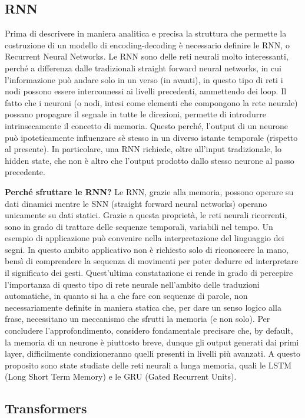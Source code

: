 \subsection{RNN}

Prima di descrivere in maniera analitica e precisa la struttura che permette la costruzione di un modello di encoding-decoding è necessario definire le RNN, o Recurrent Neural Networks.
Le RNN sono delle reti neurali molto interessanti, perché a differenza dalle tradizionali straight forward neural networks, in cui l'informazione può andare solo in un verso (in avanti), in questo tipo di reti i nodi possono essere interconnessi ai livelli precedenti, ammettendo dei loop. Il fatto che i neuroni (o nodi, intesi come elementi che compongono la rete neurale) possano propagare il segnale in tutte le direzioni, permette di introdurre intrinsecamente il concetto di memoria. Questo perché, l'output di un neurone può ipoteticamente influenzare sè stesso in un diverso istante temporale (rispetto al presente). In particolare, una RNN richiede, oltre all'input tradizionale, lo hidden state, che non è altro che l'output prodotto dallo stesso neurone al passo precedente.

\textbf{Perché sfruttare le RNN?}
Le RNN, grazie alla memoria, possono operare su dati dinamici mentre le SNN (straight forward neural networks) operano unicamente su dati statici. Grazie a questa proprietà, le reti neurali ricorrenti, sono in grado di trattare delle sequenze temporali, variabili nel tempo. Un esempio di applicazione può convenire nella interpretazione del linguaggio dei segni. In questo ambito applicativo non è richiesto solo di riconoscere la mano, bensì di comprendere la sequenza di movimenti per poter dedurre ed interpretare il significato dei gesti. Quest'ultima constatazione ci rende in grado di percepire l'importanza di questo tipo di rete neurale nell'ambito delle traduzioni automatiche, in quanto si ha a che fare con sequenze di parole, non necessariamente definite in maniera statica che, per dare un senso logico alla frase, necessitano un meccanismo che sfrutti la memoria (e non solo). Per concludere l'approfondimento, considero fondamentale precisare che, by default, la memoria di un neurone è piuttosto breve, dunque gli output generati dai primi layer, difficilmente condizioneranno quelli presenti in livelli più avanzati. A questo proposito sono state studiate delle reti neurali a lunga memoria, quali le 
LSTM (Long Short Term Memory) e le GRU (Gated Recurrent Units).

\subsection{Transformers}

